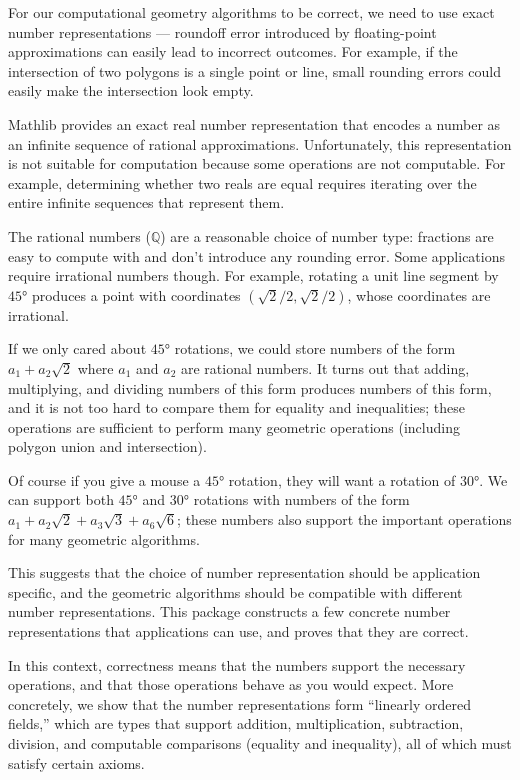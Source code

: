 For our computational geometry algorithms to be correct, we need to use exact
number representations --- roundoff error introduced by floating-point
approximations can easily lead to incorrect outcomes.  For example,
if the intersection of two polygons is a single point or line, small rounding
errors could easily make the intersection look empty.

Mathlib provides an exact real number representation that encodes a number as
an infinite sequence of rational approximations. Unfortunately, this
representation is not suitable for computation because some operations are not
computable. For example, determining whether two reals are equal requires
iterating over the entire infinite sequences that represent them.

The rational numbers ($ℚ$) are a reasonable choice of number type: fractions are easy
to compute with and don't introduce any rounding error. Some applications
require irrational numbers though. For example, rotating a unit line segment by
$45°$ produces a point with coordinates $(\sqrt{2}/2, \sqrt{2}/2)$, whose
coordinates are irrational.

If we only cared about $45°$ rotations, we could store numbers of the
form $a_1 + a_2\sqrt{2}$ where $a_1$ and $a_2$ are rational numbers. It
turns out that adding, multiplying, and dividing numbers of this form produces
numbers of this form, and it is not too hard to compare them for equality and
inequalities; these operations are sufficient to perform many geometric
operations (including polygon union and intersection).

Of course if you give a mouse a $45°$ rotation, they will want a
rotation of $30°$. We can support both $45°$ and $30°$
rotations with numbers of the form
$a_1 + a_2\sqrt{2} + a_3\sqrt{3} + a_6\sqrt{6}$; these numbers also support the
important operations for many geometric algorithms.

This suggests that the choice of number representation should be application
specific, and the geometric algorithms should be compatible with different
number representations. This package constructs a few concrete number
representations that applications can use, and proves that they are correct.

In this context, correctness means that the numbers support the necessary
operations, and that those operations behave as you would expect. More
concretely, we show that the number representations form ``linearly ordered
fields,'' which are types that support addition, multiplication, subtraction,
division, and computable comparisons (equality and inequality), all of which
must satisfy certain axioms.

